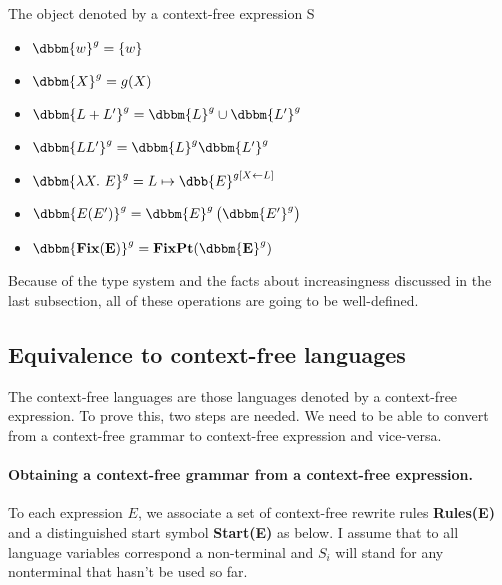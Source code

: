 \begin{definition}
The object denoted by a context-free expression S
\begin{itemize}
\item $\dbbm{w}^{g} = \left\lbrace w\right\rbrace$
\item $\dbbm{X}^{g} = g(X)$
\item $\dbbm{L + L'}^{g} = \dbbm{L}^{g} \cup\dbbm{L'}^{g} $
\item $\dbbm{LL'}^{g} = \dbbm{L}^{g} \dbbm{L'}^{g} $
\item $\dbbm{\lambda X.\ E}^{g} = L\mapsto \dbb{E}^{g[X\leftarrow L]} $
\item $\dbbm{E(E')}^{g} = \dbbm{E}^{g}\left( \dbbm{E'}^{g}\right) $
\item $\dbbm{\mathbf{Fix(E)}}^{g} = \mathbf{FixPt}(\dbbm{\mathbf{E}}^{g}) $
\end{itemize}
\end{definition}
%
Because of the type system and the facts about increasingness discussed in the last subsection, all of these operations are going to be well-defined.

\subsection{Equivalence to context-free languages}

The context-free languages are those languages denoted by a context-free expression. To prove this, two steps are needed. We need to be able to convert from a context-free grammar to context-free expression and vice-versa.

\paragraph*{Obtaining a context-free grammar from a context-free expression.} To each expression $E$, we associate a set of context-free rewrite rules \textbf{Rules(E)} and a distinguished start symbol \textbf{Start(E)} as below. I assume that to all language variables correspond a non-terminal and $S_i$ will stand for any nonterminal that hasn't be used so far.

